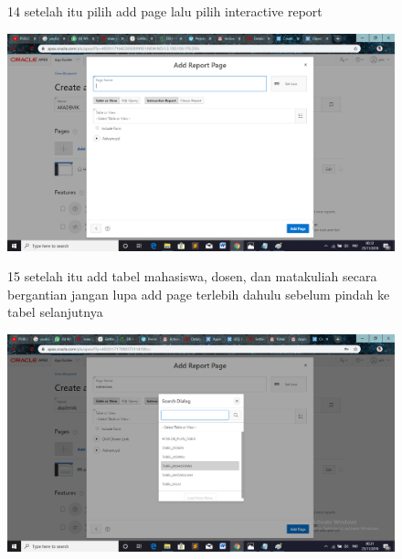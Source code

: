 \begin{enumerate}
\begin{figure}
\item[14]setelah itu pilih add page lalu pilih interactive report
 \begin{center}
\includegraphics[scale=0.4]{apex/ss20.png}
    \caption{\textit{}}
        \end{center}
\label{gambar}
\end{figure}

\begin{figure}
\item[15]setelah itu add tabel mahasiswa, dosen, dan matakuliah secara bergantian jangan lupa add page terlebih dahulu sebelum pindah ke tabel selanjutnya
 \begin{center}
\includegraphics[scale=0.4]{apex/ss21.png}
    \caption{\textit{}}
        \end{center}
\label{gambar}
\end{figure}


\end{enumerate}
